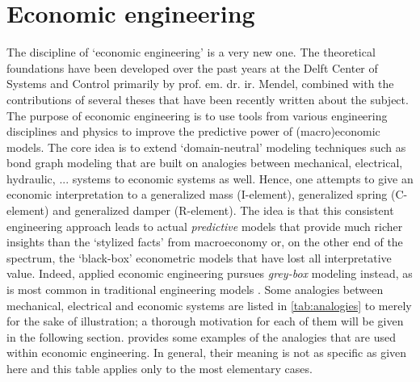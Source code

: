 \section{Economic engineering}
The discipline of `economic engineering' is a very new one. The theoretical foundations have been developed over the past years at the Delft Center of Systems and Control primarily by prof. em. dr. ir. Mendel, combined with the contributions of several theses that have been recently written about the subject. The purpose of economic engineering is to use tools from various engineering disciplines and physics to improve the predictive power of (macro)economic models. The core idea is to extend `domain-neutral' modeling techniques such as bond graph modeling \cite{Karnopp2012} that are built on analogies between mechanical, electrical, hydraulic, ... systems to economic systems as well. Hence, one attempts to give an economic interpretation to a generalized mass (I-element), generalized spring (C-element) and generalized damper (R-element). The idea is that this consistent engineering approach leads to actual \emph{predictive} models that provide much richer insights than the `stylized facts' from macroeconomy or, on the other end of the spectrum, the `black-box' econometric models that have lost all interpretative value. Indeed, applied economic engineering pursues \emph{grey-box} modeling instead, as is most common in traditional engineering models \cite{Kruimer2021}. Some analogies between mechanical, electrical and economic systems are listed in \cref{tab:analogies} to merely for the sake of illustration; a thorough motivation for each of them will be given in the following section.  provides some examples of the analogies that are used within economic engineering. In general, their meaning is not as specific as given here and this table applies only to the most elementary cases. 
